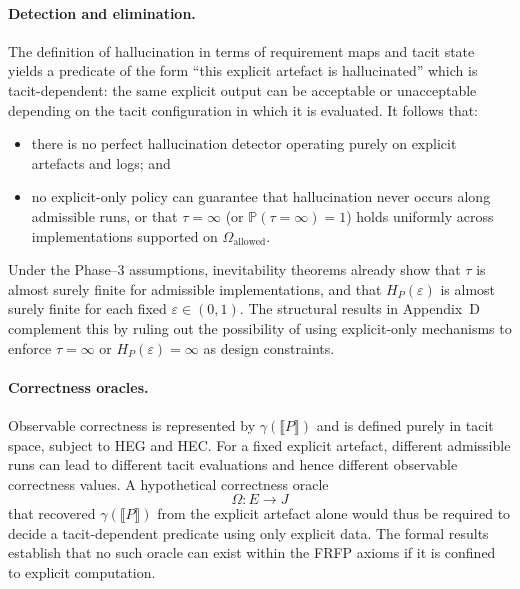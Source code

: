 \documentclass[11pt]{article}
\theoremstyle{definition}
\begin{document}
\paragraph{Detection and elimination.}
The definition of hallucination in terms of requirement maps and tacit state yields a predicate of the form “this explicit artefact is hallucinated” which is tacit-dependent: the same explicit output can be acceptable or unacceptable depending on the tacit configuration in which it is evaluated. It follows that:
\begin{itemize}
  \item there is no perfect hallucination detector operating purely on explicit artefacts and logs; and
  \item no explicit-only policy can guarantee that hallucination never occurs along admissible runs, or that $\tau = \infty$ (or $\mathbb{P}(\tau = \infty) = 1$) holds uniformly across implementations supported on $\Omega_{\mathrm{allowed}}$.
\end{itemize}
Under the Phase--3 assumptions, inevitability theorems already show that $\tau$ is almost surely finite for admissible implementations, and that $H_P(\varepsilon)$ is almost surely finite for each fixed $\varepsilon \in (0,1)$. The structural results in Appendix~D complement this by ruling out the possibility of using explicit-only mechanisms to enforce $\tau = \infty$ or $H_P(\varepsilon) = \infty$ as design constraints.

\paragraph{Correctness oracles.}
Observable correctness is represented by $\gamma(\llbracket P \rrbracket)$ and is defined purely in tacit space, subject to HEG and HEC. For a fixed explicit artefact, different admissible runs can lead to different tacit evaluations and hence different observable correctness values. A hypothetical correctness oracle
\[
  \Omega : E \longrightarrow J
\]
that recovered $\gamma(\llbracket P \rrbracket)$ from the explicit artefact alone would thus be required to decide a tacit-dependent predicate using only explicit data. The formal results establish that no such oracle can exist within the FRFP axioms if it is confined to explicit computation.
\end{document}

